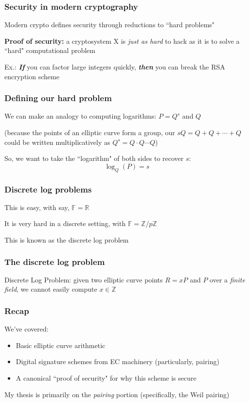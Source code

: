 \documentclass{beamer} %
\theoremstyle{definition} %
\begin{document}
\begin{frame}

\frametitle{Security in modern cryptography}

Modern crypto defines security through reductions to ``hard problems"
\pause

\textbf{Proof of security:} a cryptosystem X is \emph{just as hard} to hack as it is to solve a ``hard" computational problem

\pause

Ex.: \textbf{\emph{If}} you can factor large integers quickly, \textbf{\emph{then}} you can break the RSA encryption scheme
\end{frame}

\begin{frame}

\frametitle{Defining our hard problem}

We can make an analogy to computing logarithms: $P = Q^s$ and $Q$ 

(because the points of an elliptic curve form a group, our $sQ = Q + Q + \cdots + Q$ could be written multiplicatively as $Q^s = Q \cdot Q \cdots Q$)

\pause 

So, we want to take the ``logarithm" of both sides to recover $s$: $$\log_Q(P) = s$$
\end{frame}

\begin{frame}

\frametitle{Discrete log problems}

This is easy, with say, $\mathbb{F} = \mathbb{R}$

\pause

It is very hard in a discrete setting, with $\mathbb{F} = \mathbb{Z}/p\mathbb{Z}$

\pause

This is known as the discrete log problem
\end{frame}

\begin{frame}

\frametitle{The discrete log problem}

Discrete Log Problem: given two elliptic curve points $R = xP$ and $P$ over a \emph{finite field}, we cannot easily compute $x \in \mathbb{Z}$
\end{frame}

\begin{frame}

\frametitle{Recap}

We've covered:

\begin{itemize}
\item Basic elliptic curve arithmetic
\item Digital signature schemes from EC machinery (particularly, pairing)
\item A canonical ``proof of security" for why this scheme is secure
\end{itemize}

My thesis is primarily on the \emph{pairing} portion (specifically, the Weil pairing)
\end{frame}
\end{document}
